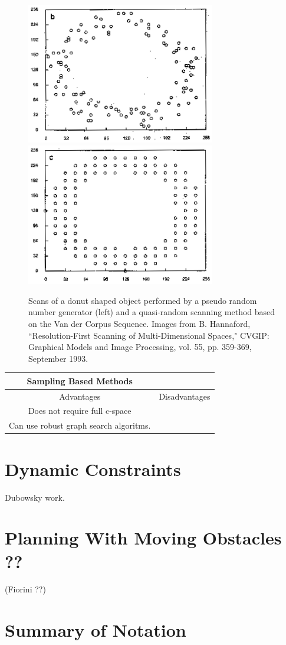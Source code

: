 \begin{figure}
\includegraphics[width=3.25in]{figs08/randomscan.eps}
\includegraphics[width=3.25in]{figs08/quasiscan.eps}
\caption{Scans of a donut shaped object performed by a pseudo random number generator (left) and a quasi-random scanning method based on the Van der Corpus Sequence.  Images from B. Hannaford, ``Resolution-First Scanning of Multi-Dimensional Spaces," CVGIP: Graphical Models and Image Processing, vol. 55, pp. 359-369, September 1993.}\label{cspacescans}
\end{figure}

\vspace{0.2in}
\begin{tabular}{|c|c|}
\hline
Sampling Based  Methods & \\ \hline \hline
Advantages		         & Disadvantages          			\\ \hline
Does not require full c-space    &         		\\ \hline
Can use robust graph search algoritms.   &     	\\ \hline
\end{tabular}

\section{Dynamic Constraints}
Dubowsky work. 

\section{Planning With Moving Obstacles ??}
(Fiorini ??)




\section{Summary of Notation}


